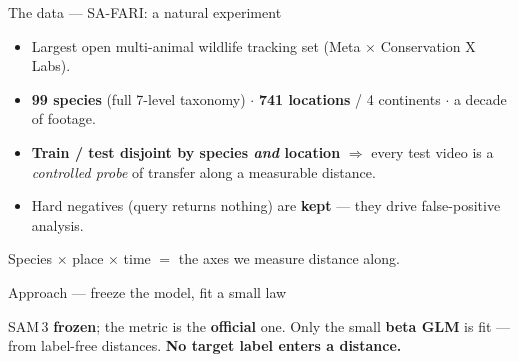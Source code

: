 \documentclass[aspectratio=169,11pt]{beamer}
\newcommand{\frozen}[1]{{\color{navy}\textbf{#1}}}
\begin{document}
\begin{frame}{The data --- SA-FARI: a natural experiment}
  \begin{itemize}
    \item Largest open multi-animal wildlife tracking set (Meta $\times$ Conservation X Labs).
    \item \textbf{99 species} (full 7-level taxonomy) $\cdot$ \textbf{741 locations} / 4 continents
          $\cdot$ a decade of footage.
    \item \textbf{Train / test disjoint by species \emph{and} location} $\Rightarrow$ every test video is
          a \emph{controlled probe} of transfer along a measurable distance.
    \item Hard negatives (query returns nothing) are \textbf{kept} --- they drive false-positive analysis.
  \end{itemize}
  \vspace{0.3em}
  \begin{block}{}
    \centering Species $\times$ place $\times$ time $=$ the axes we measure distance along.
  \end{block}
\end{frame}

\begin{frame}{Approach --- freeze the model, fit a small law}
  \centering

  \vspace{0.5em}
  \footnotesize SAM\,3 \frozen{frozen}; the metric is the \textbf{official} one. Only the small
  \frozen{beta GLM} is fit --- from label-free distances. \textbf{No target label enters a distance.}
\end{frame}
\end{document}
